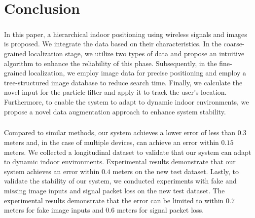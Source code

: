 \documentclass[a4paper,12pt]{report}
\begin{document}
\chapter{Conclusion}
\paragraph{}
In this paper, a hierarchical indoor positioning using wireless signals and images is proposed. We integrate the data based on their characteristics. In the coarse-grained localization stage, we utilize two types of data and propose an intuitive algorithm to enhance the reliability of this phase. Subsequently, in the fine-grained localization, we employ image data for precise positioning and employ a tree-structured image database to reduce search time. Finally, we calculate the novel input for the particle filter and apply it to track the user's location. Furthermore, to enable the system to adapt to dynamic indoor environments, we propose a novel data augmentation approach to enhance system stability.
\paragraph{}
Compared to similar methods, our system achieves a lower error of less than $0.3$ meters and, in the case of multiple devices, can achieve an error within $0.15$ meters. We collected a longitudinal dataset to validate that our system can adapt to dynamic indoor environments. Experimental results demonstrate that our system achieves an error within $0.4$ meters on the new test dataset. Lastly, to validate the stability of our system, we conducted experiments with fake and missing image inputs and signal packet loss on the new test dataset. The experimental results demonstrate that the error can be limited to within $0.7$ meters for fake image inputs and $0.6$ meters for signal packet loss.



\end{document}
